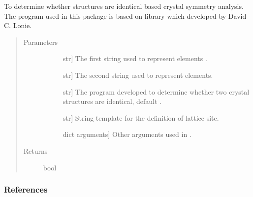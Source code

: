 \documentclass[letterpaper,10pt,english]{sphinxmanual}
\begin{document}

\begin{fulllineitems}
\label{\detokenize{pygace:pygace.utility.compare_crystal}}
\sphinxAtStartPar
To determine whether structures are identical based crystal symmetry
analysis. The program used in this package is based on  library
which developed by David C. Lonie.
\begin{quote}\begin{description}
\item[{Parameters}] \leavevmode\begin{description}
\item[{}] \leavevmode{[}str{]}
\sphinxAtStartPar
The first string used to represent elements .

\item[{}] \leavevmode{[}str{]}
\sphinxAtStartPar
The second string used to represent elements.

\item[{}] \leavevmode{[}str{]}
\sphinxAtStartPar
The program developed to determine whether two
crystal structures are identical, default .

\item[{}] \leavevmode{[}str{]}
\sphinxAtStartPar
String template for the definition of lattice site.

\item[{}] \leavevmode{[}dict arguments{]}
\sphinxAtStartPar
Other arguments used in .

\end{description}

\item[{Returns}] \leavevmode\begin{description}
\item[{bool}] \leavevmode
\end{description}

\end{description}\end{quote}
\subsubsection*{References}

\sphinxAtStartPar
{}

\end{fulllineitems}
\end{document}
